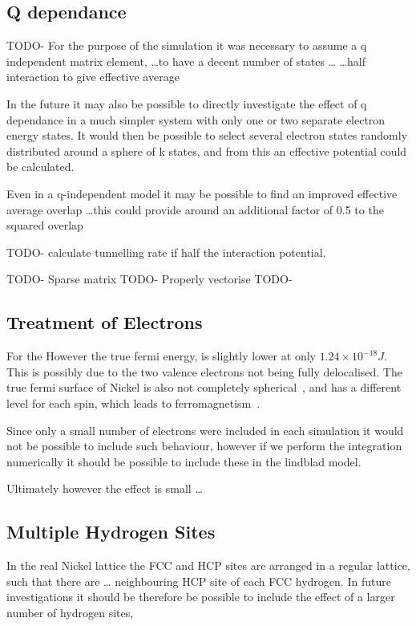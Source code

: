 \subsection{Q dependance}
TODO-
For the purpose of the simulation
it was necessary to assume a q independent
matrix element, \ldots to have a decent number of states \ldots
\ldots half interaction to give effective average

In the future it may also be possible to
directly investigate the effect
of q dependance in a much simpler system
with only one or two separate electron
energy states.
It would then be possible to select
several electron states randomly distributed
around a sphere of k states, and from
this an effective potential could be calculated.


Even in a q-independent model it may
be possible to find an improved effective
average overlap \ldots this could
provide around an additional
factor of 0.5 to the squared overlap

TODO- calculate tunnelling rate if half the
interaction potential.

TODO- Sparse matrix
TODO- Properly vectorise
TODO-

\subsection{Treatment of Electrons}
For the
However the true fermi energy, is slightly lower
at only \(1.24\times{} 10^{-18}J\). This
is possibly due to the two
valence electrons not being fully delocalised.
The true fermi surface
of Nickel is also not completely
spherical~\cite{FermiSufaceNickel},
and has a different level for each spin,
which leads to ferromagnetism~\cite{PhysRev.49.537}.

Since
only a small number of electrons
were included in each simulation
it would not be possible to include
such behaviour, however if we
perform the integration numerically
it should be possible to include these
in the lindblad model.

Ultimately however the effect is small \ldots


\subsection{Multiple Hydrogen Sites}
In the real Nickel lattice the FCC and
HCP sites are arranged in a regular
lattice, such that there are \ldots
neighbouring HCP site of each FCC
hydrogen. In future investigations
it should be therefore be
possible to include the
effect of a larger number of
hydrogen sites,


